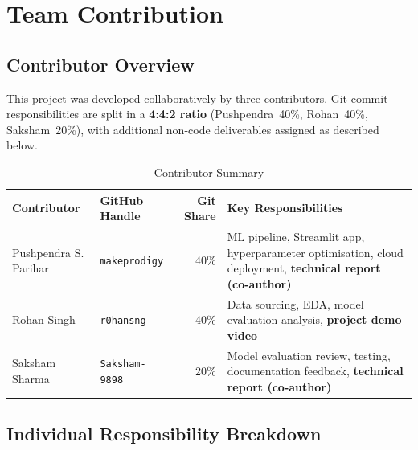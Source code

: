 \documentclass[12pt,a4paper]{article}
\begin{document}
\section{Team Contribution}

\subsection{Contributor Overview}

This project was developed collaboratively by three contributors. Git commit responsibilities are split in a \textbf{4:4:2 ratio} (Pushpendra~40\%, Rohan~40\%, Saksham~20\%), with additional non-code deliverables assigned as described below.

\begin{table}[H]
\centering
\caption{Contributor Summary}
\begin{tabular}{llrp{5.5cm}}
    \toprule
    \textbf{Contributor} & \textbf{GitHub Handle} & \textbf{Git Share} & \textbf{Key Responsibilities} \\
    \midrule
    Pushpendra S. Parihar & \texttt{makeprodigy}
        & 40\%
        & ML pipeline, Streamlit app, hyperparameter optimisation, cloud deployment, \textbf{technical report (co-author)} \\
    Rohan Singh & \texttt{r0hansng}
        & 40\%
        & Data sourcing, EDA, model evaluation analysis, \textbf{project demo video} \\
    Saksham Sharma & \texttt{Saksham-9898}
        & 20\%
        & Model evaluation review, testing, documentation feedback, \textbf{technical report (co-author)} \\
    \bottomrule
\end{tabular}
\end{table}

\subsection{Individual Responsibility Breakdown}
\end{document}
